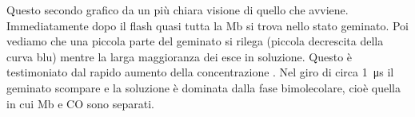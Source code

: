 \documentclass[11pt, a4paper]{article}
\begin{document}
Questo secondo grafico da un più chiara visione di quello che avviene. Immediatamente dopo il flash quasi tutta la Mb si trova nello stato geminato.
Poi vediamo che una piccola parte del geminato si rilega (piccola decrescita della curva blu) mentre la larga maggioranza dei  esce in soluzione.
Questo è testimoniato dal rapido aumento della concentrazione \ce{[Mb]}. Nel giro di circa \qty{1}{\micro\second} il geminato scompare e la soluzione
è dominata dalla fase bimolecolare, cioè quella in cui Mb e CO sono separati.
\end{document}
